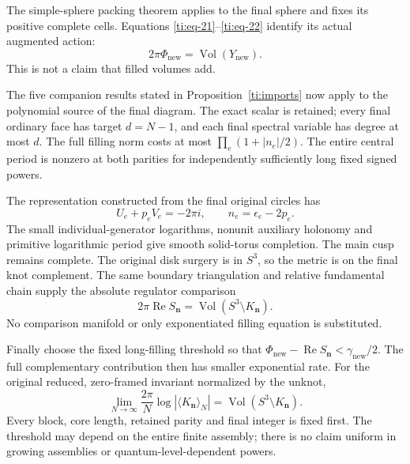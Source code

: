 \documentclass[11pt]{article}
\numberwithin{equation}{section}
\theoremstyle{definition}\newtheorem{definition}[theorem]{Definition}
\theoremstyle{remark}\newtheorem{remark}[theorem]{Remark}
\begin{document}
The simple-sphere packing theorem \cite[Proposition 2.1]{Marked} applies to the final sphere and fixes its positive complete cells. Equations \eqref{ti:eq-21}--\eqref{ti:eq-22} identify its actual augmented action:
\begin{equation}\label{ti:eq-24}
2\pi\Phi_{\mathrm{new}}=\operatorname{Vol}(Y_{\mathrm{new}}).
\end{equation}
This is not a claim that filled volumes add.

The five companion results stated in Proposition~\ref{ti:imports} now apply to the polynomial source of the final diagram. The exact scalar is retained; every final ordinary face has target \(d=N-1\), and each final spectral variable has degree at most \(d\). The full filling norm costs at most
\(\prod_e(1+|n_e|/2)\). The entire central period is nonzero at both parities for independently sufficiently long fixed signed powers.

The representation constructed from the final original circles has
\begin{equation}\label{ti:eq-25}
U_e+p_eV_e=-2\pi i,\qquad n_e=\epsilon_e-2p_e.
\end{equation}
The small individual-generator logarithms, nonunit auxiliary holonomy and primitive logarithmic period give smooth solid-torus completion. The main cusp remains complete. The original disk surgery is in \(S^3\), so the metric is on the final knot complement. The same boundary triangulation and relative fundamental chain supply the absolute regulator comparison
\begin{equation}\label{ti:eq-26}
2\pi\operatorname{Re}S_{\boldsymbol n}
=\operatorname{Vol}(S^3\setminus K_{\boldsymbol n}).
\end{equation}
No comparison manifold or only exponentiated filling equation is substituted.

Finally choose the fixed long-filling threshold so that
\(\Phi_{\mathrm{new}}-\operatorname{Re}S_{\boldsymbol n}
<\gamma_{\mathrm{new}}/2\). The full complementary contribution then has smaller exponential rate. For the original reduced, zero-framed invariant normalized by the unknot,
\begin{equation}\label{ti:eq-27}
\lim_{N\to\infty}\frac{2\pi}{N}
\log\left|\langle K_{\boldsymbol n}\rangle_N\right|
=\operatorname{Vol}(S^3\setminus K_{\boldsymbol n}).
\end{equation}
Every block, core length, retained parity and final integer is fixed first. The threshold may depend on the entire finite assembly; there is no claim uniform in growing assemblies or quantum-level-dependent powers.
\end{document}
